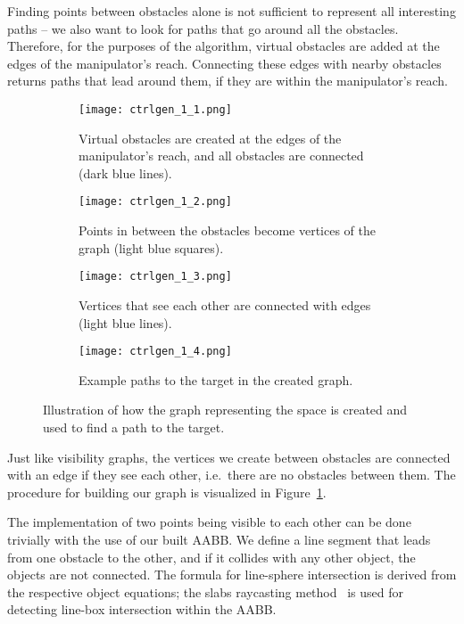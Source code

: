 Finding points between obstacles alone is not sufficient to represent all interesting paths -- we also want to look for paths that go around all the obstacles. Therefore, for the purposes of the algorithm, virtual obstacles are added at the edges of the manipulator's reach. Connecting these edges with nearby obstacles returns paths that lead around them, if they are within the manipulator's reach.

\begin{figure}
    \centering
    \begin{subfigure}{.45\textwidth}
      \texttt{[image: ctrlgen\_1\_1.png]}
      \caption{Virtual obstacles are created at the edges of the manipulator's reach, and all obstacles are connected (dark blue lines).}
    \end{subfigure}
    \begin{subfigure}{0.45\textwidth}
      \texttt{[image: ctrlgen\_1\_2.png]}
      \caption{Points in between the obstacles become vertices of the graph (light blue squares).}
    \end{subfigure}

    \begin{subfigure}{.45\textwidth}
      \texttt{[image: ctrlgen\_1\_3.png]}
      \caption{Vertices that see each other are connected with edges (light blue lines).}
    \end{subfigure}
    \begin{subfigure}{0.45\textwidth}
      \texttt{[image: ctrlgen\_1\_4.png]}
      \caption{Example paths to the target in the created graph.}
    \end{subfigure}
    \caption{Illustration of how the graph representing the space is created and used to find a path to the target.}\label{fig:ctrlgen}
  \end{figure}

Just like visibility graphs, the vertices we create between obstacles are connected with an edge if they see each other, i.e.\ there are no obstacles between them. The procedure for building our graph is visualized in Figure~\ref{fig:ctrlgen}.

The implementation of two points being visible to each other can be done trivially with the use of our built AABB. We define a line segment that leads from one obstacle to the other, and if it collides with any other object, the objects are not connected. The formula for line-sphere intersection is derived from the respective object equations; the slabs raycasting method~\cite{slabs} is used for detecting line-box intersection within the AABB.

